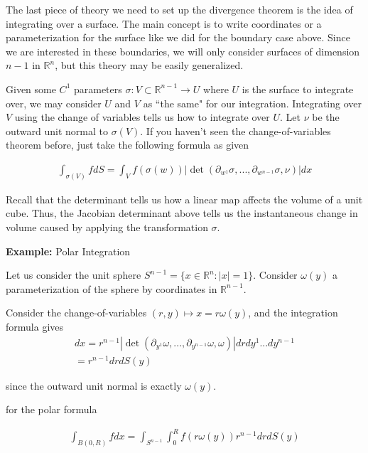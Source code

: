 \documentclass{article}
\newcommand{\R}{{\mathbb{R}}}
\newcommand{\pd}{\partial}
\begin{document}
	The last piece of theory we need to set up the divergence theorem is the idea of integrating over a surface. The main concept is to write coordinates or a parameterization for the surface like we did for the boundary case above. Since we are interested in these boundaries, we will only consider surfaces of dimension $n-1$ in $\R^{n}$, but this theory may be easily generalized. 
	
	Given some $C^1$ parameters $\sigma: V \subset \R^{n-1} \to U$ where $U$ is the surface to integrate over, we may consider $U$ and $V$ as ``the same" for our integration. Integrating over $V$ using the change of variables tells us how to integrate over $U$. Let $\nu$ be the outward unit normal to $\sigma(V)$. If you haven't seen the change-of-variables theorem before, just take the following formula as given
	
	\begin{align*}
		\int_{\sigma(V)} f dS = \int_{V} f(\sigma(w))| \det(\pd_{w^1}\sigma,...,\pd_{w^{n-1}}\sigma, \nu ) |dx
	\end{align*}
	
	Recall that the determinant tells us how a linear map affects the volume of a unit cube. Thus, the Jacobian determinant above tells us the instantaneous change in volume caused by applying the transformation $\sigma$. 
	
	\vspace{0.25 cm}
	\textbf{Example:} Polar Integration
	
	Let us consider the unit sphere $S^{n-1} = \{x \in \R^{n}: |x|=1\}$. Consider $\omega(y)$ a parameterization of the sphere by coordinates in $\R^{n-1}$.
	
	Consider the change-of-variables $(r,y) \mapsto x= r \omega(y)$, and the integration formula gives
	\begin{align*}
		dx = r^{n-1} | \det(\pd_{y^1}\omega,...,\pd_{y^{n-1}}\omega, \omega )|drdy^{1}...dy^{n-1} \\
		= r^{n-1} dr dS(y)
	\end{align*} 
	
	since the outward unit normal is exactly $\omega(y)$.
	
	for the polar formula
	
	\begin{align*}
		\int_{B(0,R)} f dx = \int_{S^{n-1}} \int_{0}^{R} f(r\omega(y))r^{n-1}drdS(y)
	\end{align*}
	
	\vspace{0.25cm} 
	
\end{document}
